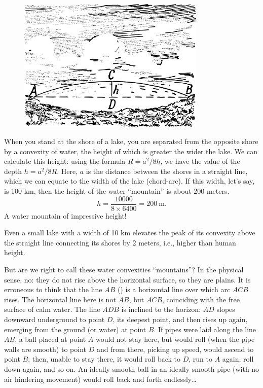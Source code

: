 \begin{figure}[h!]
\centering
\includegraphics[width=0.8\textwidth]{figures/ch-04/fig-087.pdf}
\end{figure}

When you stand at the shore of a lake, you are separated from the opposite shore by a convexity of water, the height of which is greater the wider the lake. We can calculate this height: using the formula $R = a^{2}/8h$, we have the value of the depth $h = a^{2}/8R$. Here, $a$ is the distance between the shores in a straight line, which we can equate to the width of the lake (chord-arc). If this width, let's say, is 100 km, then the height of the water ``mountain'' is about 200 meters.
\begin{equation*}%
h = \frac{10000}{8 \times 6400} = \SI{200}{\meter}.
\end{equation*}
A water mountain of impressive height!

Even a small lake with a width of 10 km elevates the peak of its convexity above the straight line connecting its shores by 2 meters, i.e., higher than human height.




But are we right to call these water convexities ``mountains''? In the physical sense, no: they do not rise above the horizontal surface, so they are plains. It is erroneous to think that the line $AB$ () is a horizontal line over which arc $ACB$ rises. The horizontal line here is not $AB$, but $ACB$, coinciding with the free surface of calm water. The line $ADB$ is inclined to the horizon: $AD$ slopes downward underground to point $D$, its deepest point, and then rises up again, emerging from the ground (or water) at point $B$. If pipes were laid along the line $AB$, a ball placed at point $A$ would not stay here, but would roll (when the pipe walls are smooth) to point $D$ and from there, picking up speed, would ascend to point $B$; then, unable to stay there, it would roll back to $D$, run to $A$ again, roll down again, and so on. An ideally smooth ball in an ideally smooth pipe (with no air hindering movement) would roll back and forth endlessly\dots{}

